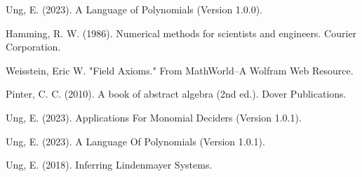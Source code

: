 Ung, E. (2023). A Language of Polynomials (Version 1.0.0). 

Hamming, R. W. (1986). Numerical methods for scientists and engineers. Courier Corporation.

Weisstein, Eric W. "Field Axioms." From MathWorld--A Wolfram Web Resource. 

Pinter, C. C. (2010). A book of abstract algebra (2nd ed.). Dover Publications.

Ung, E. (2023). Applications For Monomial Deciders (Version 1.0.1).

Ung, E. (2023). A Language Of Polynomials (Version 1.0.1).

Ung, E. (2018). Inferring Lindenmayer Systems.


